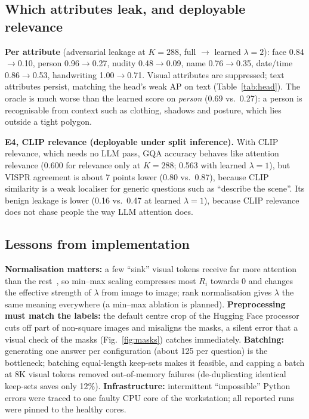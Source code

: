 \documentclass[10pt]{article}
\newcommand{\R}{R}
\begin{document}
\EsixText

\subsection{Which attributes leak, and deployable relevance}
\textbf{Per attribute} (adversarial leakage at $K{=}288$, full $\to$ learned $\lambda{=}2$): face 0.84$\to$0.10, person 0.96$\to$0.27, nudity 0.48$\to$0.09, name 0.76$\to$0.35, date/time 0.86$\to$0.53, handwriting 1.00$\to$0.71.
Visual attributes are suppressed; text attributes persist, matching the head's weak AP on text (Table~\ref{tab:head}). The oracle is much worse than the learned score on \emph{person} (0.69 vs.\ 0.27):
a person is recognisable from context such as clothing, shadows and posture, which lies outside a tight polygon.

\textbf{E4, CLIP relevance (deployable under split inference).} With CLIP relevance, which needs no LLM pass, GQA accuracy behaves like attention relevance (0.600 for relevance only at $K{=}288$; 0.563 with learned $\lambda{=}1$),
but VISPR agreement is about 7 points lower (0.80 vs.\ 0.87), because CLIP similarity is a weak localiser for generic questions such as ``describe the scene''.
Its benign leakage is lower (0.16 vs.\ 0.47 at learned $\lambda{=}1$), because CLIP relevance does not chase people the way LLM attention does.

\subsection{Lessons from implementation}
\textbf{Normalisation matters:} a few ``sink'' visual tokens receive far more attention than the rest~\cite{darcet2024registers}, so min--max scaling compresses most $\R_i$ towards 0 and changes the effective strength of $\lambda$ from image to image; rank normalisation gives $\lambda$ the same meaning everywhere (a min--max ablation is planned).
\textbf{Preprocessing must match the labels:} the default centre crop of the Hugging Face processor cuts off part of non-square images and misaligns the masks, a silent error that a visual check of the masks (Fig.~\ref{fig:masks}) catches immediately.
\textbf{Batching:} generating one answer per configuration (about 125 per question) is the bottleneck; batching equal-length keep-sets makes it feasible, and capping a batch at 8K visual tokens removed out-of-memory failures (de-duplicating identical keep-sets saves only 12\%).
\textbf{Infrastructure:} intermittent ``impossible'' Python errors were traced to one faulty CPU core of the workstation; all reported runs were pinned to the healthy cores.
\end{document}
